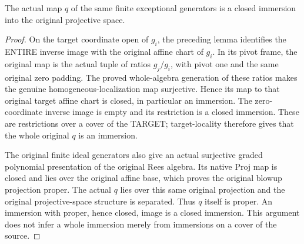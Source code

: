 \begin{lemma}
\leanok
\label{lem:kn-nadel-nef-big-exceptional-projective-closed}
The actual map $q$ of the same finite exceptional generators is a closed
immersion into the original projective space.
\end{lemma}
\begin{proof}
On the target coordinate open of $g_i$, the preceding lemma identifies the
ENTIRE inverse image with the original affine chart of $g_i$. In its pivot
frame, the original map is the actual tuple of ratios $g_j/g_i$, with pivot
one and the same original zero padding. The proved whole-algebra generation
of these ratios makes the genuine homogeneous-localization map surjective.
Hence its map to that original target affine chart is closed, in particular
an immersion. The zero-coordinate inverse image is empty and its restriction
is a closed immersion. These are restrictions over a cover of the TARGET;
target-locality therefore gives that the whole original $q$ is an immersion.

The original finite ideal generators also give an actual surjective graded
polynomial presentation of the original Rees algebra. Its native Proj map
is closed and lies over the original affine base, which proves the original
blowup projection proper. The actual $q$ lies over this same original
projection and the original projective-space structure is separated. Thus
$q$ itself is proper. An immersion with proper, hence closed, image is a
closed immersion. This argument does not infer a whole immersion merely
from immersions on a cover of the source.
\end{proof}

